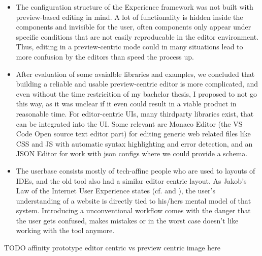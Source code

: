 \begin{itemize}
  \item The configuration structure of the Experience framework was not built with preview-based editing in mind. A lot of functionality is hidden inside the components and invisible for the user,
  often components only appear under specific conditions that are not easily reproducable in the editor environment. Thus, editing in a preview-centric mode could in many situations
  lead to more confusion by the editors than speed the process up.
  \item After evaluation of some avaialble libraries and examples, we concluded that building a reliable and usable preview-centric editor is more complicated, and even without the time restricition of my bachelor thesis, I proposed to not go this way,
  as it was unclear if it even could result in a viable product in reasonable time. For editor-centric UIs, many thirdparty libraries exist, that can be integrated into the UI.
  Some relevant are Monaco Editor (the VS Code Open source text editor part) for editing generic web related files like CSS and JS with automatic syntax highlighting and error detection, and an JSON Editor for work with json configs where we could provide a schema.
  \item The userbase consists mostly of tech-affine people who are used to layouts of IDEs, and the old tool also had a similar editor centric layout.
  As Jakob's Law of the Internet User Experience states (cf. \cite{Nielsen:2000} and \cite[p. 2]{LawsOfUX:2020ys}), the user's understanding of a website is directly tied to his/hers mental model of that system.
  Introducing a unconventional workflow comes with the danger that the user gets confused, makes mistakes or in the worst case doesn't like working with the tool anymore.

\end{itemize}

TODO affinity prototype editor centric vs preview centric image here